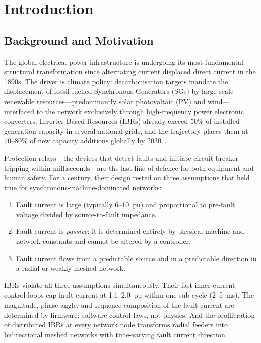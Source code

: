 \chapter{Introduction}
\label{ch:introduction}

\section{Background and Motivation}
\label{sec:ch1_background}

The global electrical power infrastructure is undergoing its most fundamental
structural transformation since alternating current displaced direct current
in the 1890s. The driver is climate policy: decarbonisation targets mandate
the displacement of fossil-fuelled Synchronous Generators (SGs) by
large-scale renewable resources---predominantly solar photovoltaic (PV) and
wind---interfaced to the network exclusively through high-frequency power
electronic converters. Inverter-Based Resources (IBRs) already exceed
50\% of installed generation capacity in several national grids, and the
trajectory places them at 70--80\% of new capacity additions globally
by 2030~\citep{IRENA2023}.

Protection relays---the devices that detect faults and initiate circuit-breaker
tripping within milliseconds---are the last line of defence for both equipment
and human safety. For a century, their design rested on three assumptions
that held true for synchronous-machine-dominated networks:
\begin{enumerate}
\item Fault current is large (typically 6--10~pu) and proportional to
      pre-fault voltage divided by source-to-fault impedance.
\item Fault current is \emph{passive}: it is determined entirely by physical
      machine and network constants and cannot be altered by a controller.
\item Fault current flows from a predictable source and in a predictable
      direction in a radial or weakly-meshed network.
\end{enumerate}

IBRs violate all three assumptions simultaneously. Their fast inner current
control loops cap fault current at 1.1--2.0~pu within one sub-cycle (2--5~ms).
The magnitude, phase angle, and sequence composition of the fault current
are determined by firmware: software control laws, not physics. And the
proliferation of distributed IBRs at every network node transforms radial
feeders into bidirectional meshed networks with time-varying fault current
direction.

